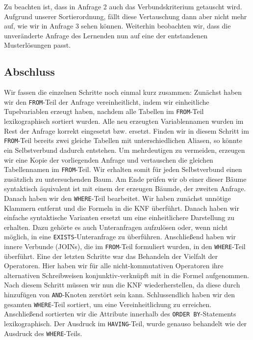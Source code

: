 Zu beachten ist, dass in Anfrage 2 auch das Verbundskriterium getauscht wird. Aufgrund unserer Sortierordnung, fällt diese Vertauschung dann aber nicht mehr auf, wie wir in Anfrage 3 sehen können. Weiterhin beobachten wir, dass die unveränderte Anfrage des Lernenden nun auf eine der entstandenen Musterlösungen passt.

\subsection{Abschluss}

Wir fassen die einzelnen Schritte noch einmal kurz zusammen: Zunächst haben wir den \verb|FROM|-Teil der Anfrage vereinheitlicht, indem wir einheitliche Tupelvariablen erzeugt haben, nachdem alle Tabellen im \verb|FROM|-Teil lexikographisch sortiert wurden. Alle neu erzeugten Variablennamen wurden im Rest der Anfrage korrekt eingesetzt bzw. ersetzt. Finden wir in diesem Schritt im \verb|FROM|-Teil bereits zwei gleiche Tabellen mit unterschiedlichen Aliasen, so könnte ein Selbstverbund dadurch entstehen. Um mehrdeutigen zu vermeiden, erzeugen wir eine Kopie der vorliegenden Anfrage und vertauschen die gleichen Tabellennamen im \verb|FROM|-Teil. Wir erhalten somit für jeden Selbstverbund einen zusätzlich zu untersuchenden Baum. Am Ende prüfen wir ob einer dieser Bäume syntaktisch äquivalent ist mit einem der erzeugen Bäumde, der zweiten Anfrage. Danach haben wir den \verb|WHERE|-Teil bearbeitet. Wir haben zunächst unnötige Klammern entfernt und die Formeln in die KNF überführt. Danach haben wir einfache syntaktische Varianten ersetzt um eine einheitlichere Darstellung zu erhalten. Dazu gehörte es auch Unteranfragen aufzulösen oder, wenn nicht möglich, in eine \verb|EXISTS|-Unteranfrage zu überführen. Anschließend haben wir innere Verbunde (JOINs), die im \verb|FROM|-Teil formuliert wurden, in den \verb|WHERE|-Teil überführt. Eine der letzten Schritte war das Behandeln der Vielfalt der Operatoren. Hier haben wir für alle nicht-kommutativen Operatoren ihre alternativen Schreibweisen konjunktiv-verknüpft mit in die Formel aufgenommen. Nach diesem Schritt müssen wir nun die KNF wiederherstellen, da diese durch hinzufügen von \verb|AND|-Knoten zerstört sein kann. Schlussendlich haben wir den gesamten \verb|WHERE|-Teil sortiert, um eine Vereinheitlichung zu erreichen. Anschließend sortierten wir die Attribute innerhalb des \verb|ORDER BY|-Statements lexikographisch. Der Ausdruck im \verb|HAVING|-Teil, wurde genauso behandelt wie der Ausdruck des \verb|WHERE|-Teils. 

